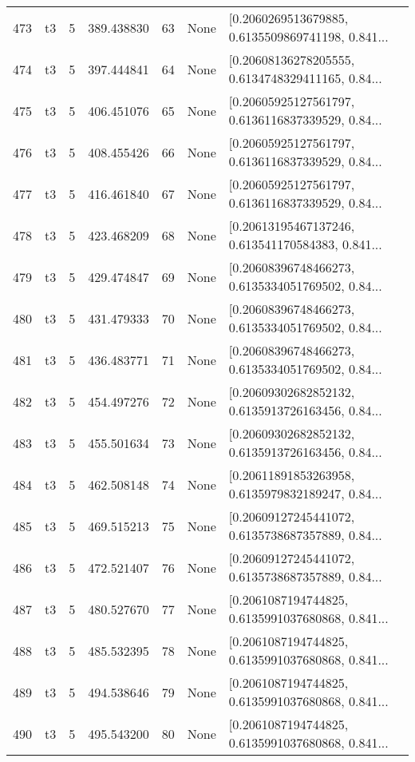 \begin{tabular}{lllrlll}
473 &  t3 &   5 &  389.438830 &   63 &  None &  [0.2060269513679885, 0.6135509869741198, 0.841... \\
474 &  t3 &   5 &  397.444841 &   64 &  None &  [0.20608136278205555, 0.6134748329411165, 0.84... \\
475 &  t3 &   5 &  406.451076 &   65 &  None &  [0.20605925127561797, 0.6136116837339529, 0.84... \\
476 &  t3 &   5 &  408.455426 &   66 &  None &  [0.20605925127561797, 0.6136116837339529, 0.84... \\
477 &  t3 &   5 &  416.461840 &   67 &  None &  [0.20605925127561797, 0.6136116837339529, 0.84... \\
478 &  t3 &   5 &  423.468209 &   68 &  None &  [0.20613195467137246, 0.613541170584383, 0.841... \\
479 &  t3 &   5 &  429.474847 &   69 &  None &  [0.20608396748466273, 0.6135334051769502, 0.84... \\
480 &  t3 &   5 &  431.479333 &   70 &  None &  [0.20608396748466273, 0.6135334051769502, 0.84... \\
481 &  t3 &   5 &  436.483771 &   71 &  None &  [0.20608396748466273, 0.6135334051769502, 0.84... \\
482 &  t3 &   5 &  454.497276 &   72 &  None &  [0.20609302682852132, 0.6135913726163456, 0.84... \\
483 &  t3 &   5 &  455.501634 &   73 &  None &  [0.20609302682852132, 0.6135913726163456, 0.84... \\
484 &  t3 &   5 &  462.508148 &   74 &  None &  [0.20611891853263958, 0.6135979832189247, 0.84... \\
485 &  t3 &   5 &  469.515213 &   75 &  None &  [0.20609127245441072, 0.6135738687357889, 0.84... \\
486 &  t3 &   5 &  472.521407 &   76 &  None &  [0.20609127245441072, 0.6135738687357889, 0.84... \\
487 &  t3 &   5 &  480.527670 &   77 &  None &  [0.2061087194744825, 0.6135991037680868, 0.841... \\
488 &  t3 &   5 &  485.532395 &   78 &  None &  [0.2061087194744825, 0.6135991037680868, 0.841... \\
489 &  t3 &   5 &  494.538646 &   79 &  None &  [0.2061087194744825, 0.6135991037680868, 0.841... \\
490 &  t3 &   5 &  495.543200 &   80 &  None &  [0.2061087194744825, 0.6135991037680868, 0.841... \\
\bottomrule
\end{tabular}
